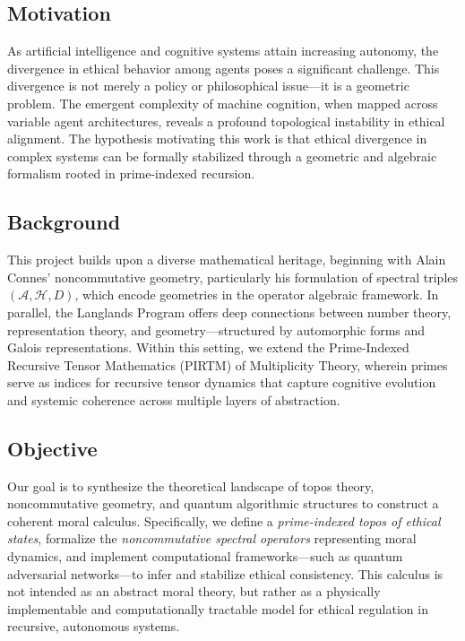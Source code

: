 \documentclass{article}
\theoremstyle{plain}
\theoremstyle{claimstyle}
\begin{document}
\subsection{Motivation}

As artificial intelligence and cognitive systems attain increasing autonomy, the divergence in ethical behavior among agents poses a significant challenge. This divergence is not merely a policy or philosophical issue—it is a geometric problem. The emergent complexity of machine cognition, when mapped across variable agent architectures, reveals a profound topological instability in ethical alignment. The hypothesis motivating this work is that ethical divergence in complex systems can be formally stabilized through a geometric and algebraic formalism rooted in prime-indexed recursion.

\subsection{Background}

This project builds upon a diverse mathematical heritage, beginning with Alain Connes’ noncommutative geometry, particularly his formulation of spectral triples \((\mathcal{A}, \mathcal{H}, D)\), which encode geometries in the operator algebraic framework. In parallel, the Langlands Program offers deep connections between number theory, representation theory, and geometry—structured by automorphic forms and Galois representations. Within this setting, we extend the Prime-Indexed Recursive Tensor Mathematics (PIRTM) of Multiplicity Theory, wherein primes serve as indices for recursive tensor dynamics that capture cognitive evolution and systemic coherence across multiple layers of abstraction.

\subsection{Objective}

Our goal is to synthesize the theoretical landscape of topos theory, noncommutative geometry, and quantum algorithmic structures to construct a coherent moral calculus. Specifically, we define a \emph{prime-indexed topos of ethical states}, formalize the \emph{noncommutative spectral operators} representing moral dynamics, and implement computational frameworks—such as quantum adversarial networks—to infer and stabilize ethical consistency. This calculus is not intended as an abstract moral theory, but rather as a physically implementable and computationally tractable model for ethical regulation in recursive, autonomous systems.
\end{document}
